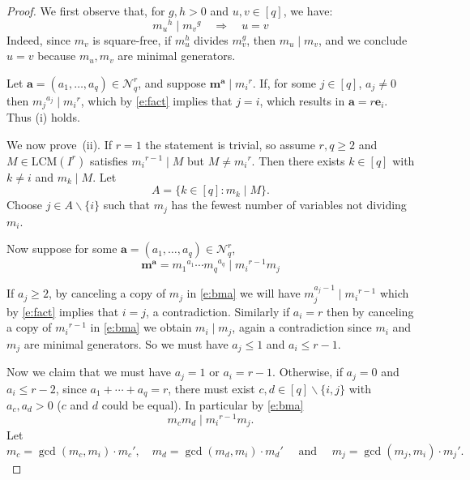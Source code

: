 \documentclass[11pt]{article}
\theoremstyle{definition}
\numberwithin{equation}{section}
\newcommand{\Nrq}{\mathcal{N}^r_q}
\newcommand{\LCM}{\mathrm{LCM}}
\newcommand{\ba}{\mathbf{a}}
\newcommand{\be}{\mathbf{e}}
\newcommand{\bma}{\mathbf{m}^\ba}
\newcommand{\qand}{\quad \mbox{ and } \quad }
\begin{document}
  \begin{proof} We first observe that, for $g,h>0$ and $u,v\in [q]$, we have:
    \begin{equation}\label{e:fact}
                {m_u}^{h} \mid {m_v}^{g}\quad   \Longrightarrow  \quad u=v 
    \end{equation}
Indeed, since $m_v$ is square-free, if $m_u^{h}$ divides $m_v^g$, then  $m_u\mid m_v$, and we conclude $u=v$ because $m_u, m_v$ are minimal generators. 
    
  Let $\ba=(a_1,\ldots,a_q) \in \Nrq$, and suppose $\bma \mid
  {m_i}^r$. If, for some $j \in [q]$, $a_j \neq 0$ then ${m_j}^{a_j}
  \mid {m_i}^r$, which by \eqref{e:fact} implies that $j=i$, which
  results in $\ba=r\be_i$. Thus \textup{(}i\textup{)} holds.

  We now prove~\textup{(}ii\textup{)}. If $r=1$ the statement is trivial, so assume $r, q \geq 2$ and $M \in \LCM(I^r)$
  satisfies ${m_i}^{r-1}\mid M$ but $M \neq {m_i}^r$. Then there
  exists $k\in [q]$ with $k \neq i$ and $m_k \mid M$. Let $$A=\{k\in
  [q]\colon m_k\mid M\}.$$ Choose $j \in A \smallsetminus\{i\}$ such that $m_j$
  has the fewest number of variables not dividing $m_i$. 

  Now suppose for some $\ba=(a_1,\ldots,a_q) \in \Nrq$,
  \begin{equation}\label{e:bma}
    \bma={m_1}^{a_1}\cdots {m_q}^{a_q} \mid {m_i}^{r-1}m_j
  \end{equation}

  If $a_j \geq 2$, by canceling a copy of $m_j$ in \eqref{e:bma} we
  will have $m_j^{a_j-1} \mid {m_i}^{r-1}$ which by \eqref{e:fact}
  implies that $i=j$, a contradiction.  Similarly if $a_i = r$ then
  by canceling a copy of ${m_i}^{r-1}$ in \eqref{e:bma} we obtain
  $m_i \mid m_j$, again a contradiction since $m_i$ and $m_j$ are minimal generators.
  So we must have $a_j \leq 1$ and $a_i \leq r-1$.

  Now we claim that we must have $a_j=1$ or $a_i=r-1$. Otherwise, if
  $a_j=0$ and $a_i \leq r-2$, since $a_1+\cdots + a_q=r$, there must exist $c,d\in
  [q]\smallsetminus\{i,j\}$ with $a_c,a_d>0$ \textup{(}$c$ and $d$ could be equal\textup{)}. In particular by \eqref{e:bma}
\begin{equation}\label{e:cd}
m_cm_d \mid {m_i}^{r-1}m_j.
\end{equation}
Let 
\begin{equation}\label{e:cj}
  m_c=\gcd(m_c,m_i) \cdot m_c', \quad
  m_d=\gcd(m_d,m_i) \cdot m_d' \qand
  m_j=\gcd(m_j,m_i) \cdot m_j'.
\end{equation}


\end{proof}
\end{document}
